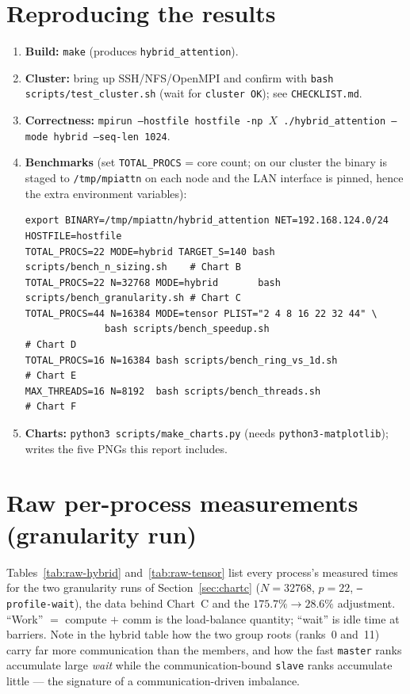 \documentclass[11pt,a4paper]{article}
\newcommand{\code}[1]{\texttt{#1}}
\begin{document}
\section{Reproducing the results}
\begin{enumerate}[leftmargin=1.6em]
\item \textbf{Build:} \code{make} (produces \code{hybrid\_attention}).
\item \textbf{Cluster:} bring up SSH/NFS/OpenMPI and confirm with
      \code{bash scripts/test\_cluster.sh} (wait for \code{cluster OK}); see
      \code{CHECKLIST.md}.
\item \textbf{Correctness:}
      \code{mpirun --hostfile hostfile -np $X$ ./hybrid\_attention --mode hybrid --seq-len 1024}.
\item \textbf{Benchmarks} (set \code{TOTAL\_PROCS} = core count; on our cluster the
      binary is staged to \code{/tmp/mpiattn} on each node and the LAN interface is
      pinned, hence the extra environment variables):
\begin{lstlisting}[numbers=none,mathescape=false]
export BINARY=/tmp/mpiattn/hybrid_attention NET=192.168.124.0/24 HOSTFILE=hostfile
TOTAL_PROCS=22 MODE=hybrid TARGET_S=140 bash scripts/bench_n_sizing.sh    # Chart B
TOTAL_PROCS=22 N=32768 MODE=hybrid       bash scripts/bench_granularity.sh # Chart C
TOTAL_PROCS=44 N=16384 MODE=tensor PLIST="2 4 8 16 22 32 44" \
              bash scripts/bench_speedup.sh                                # Chart D
TOTAL_PROCS=16 N=16384 bash scripts/bench_ring_vs_1d.sh                    # Chart E
MAX_THREADS=16 N=8192  bash scripts/bench_threads.sh                       # Chart F
\end{lstlisting}
\item \textbf{Charts:} \code{python3 scripts/make\_charts.py} (needs
      \code{python3-matplotlib}); writes the five PNGs this report includes.
\end{enumerate}

\section{Raw per-process measurements (granularity run)}
\label{app:raw}
Tables~\ref{tab:raw-hybrid} and~\ref{tab:raw-tensor} list every process's measured
times for the two granularity runs of Section~\ref{sec:chartc} ($N=32768$, $p=22$,
\code{--profile-wait}), the data behind Chart~C and the $175.7\%\!\to\!28.6\%$
adjustment. ``Work'' $=$ compute $+$ comm is the load-balance quantity; ``wait'' is
idle time at barriers. Note in the hybrid table how the two group roots (ranks~0
and~11) carry far more communication than the members, and how the fast
\code{master} ranks accumulate large \emph{wait} while the communication-bound
\code{slave} ranks accumulate little --- the signature of a communication-driven
imbalance.
\end{document}
